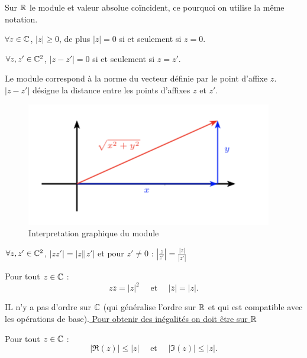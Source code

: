 \documentclass[a4paper, 11pt]{article}
\begin{document}
\begin{remarques}
\item Sur $\mathbb{R}$ le module et valeur absolue coïncident, ce pourquoi on utilise la même notation.
\item $\forall z\in \mathbb{C}$, $|z| \geq 0$, de plus  $|z| =0$ si et seulement si $z=0$.
\item $\forall z,z'\in \mathbb{C}^2$, $|z-z'| =0$ si et seulement si $z=z'$.
\item  Le module correspond à la norme du vecteur définie par le point d'affixe $z$. 
$|z-z'|$ désigne la distance entre les points d'affixes $z$ et $z'$. 
\begin{figure}[h]
\centering
\includegraphics[scale=0.8]{images/module}
\vspace{-0.4cm}
\caption{Interpretation graphique du module }
\end{figure}
\end{remarques}

\begin{prop}

$\forall z,z'\in \mathbb{C}^2$,  $|zz'| =|z| |z'| $ et pour $z'\neq 0$ : 
$\left|\frac{z}{z'}\right| =\frac{|z|}{|z'|}$

\end{prop}

\begin{prop}
Pour tout $z\in \mathbb{C}$ :
$$ z \bar{z} =|z|^2 \quad \text{ et } \quad |\bar {z} |= | z|.$$
\end{prop}

IL n'y a pas d'ordre sur $\mathbb{C}$ (qui généralise l'ordre sur $\mathbb{R}$ et qui est compatible avec les opérations de base).\underline{ Pour obtenir des inégalités on doit être  sur $\mathbb{R}$}
\begin{prop}
Pour tout $z\in \mathbb{C}$ :
$$ |\Re(z)|\leq |z| \quad \text{ et } \quad |\Im({z}) |\leq  | z|.$$
\end{prop}
\end{document}
